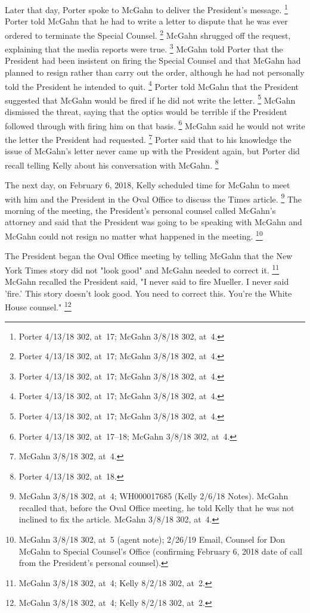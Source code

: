 {Later that day, Porter spoke to McGahn to deliver the President's message.%
\footnote{Porter 4/13/18 302, at~17;
McGahn 3/8/18 302, at~4.}
Porter told McGahn that he had to write a letter to dispute that he was ever ordered to terminate the Special Counsel.%
\footnote{Porter 4/13/18 302, at~17;
McGahn 3/8/18 302, at~4.}
McGahn shrugged off the request, explaining that the media reports were true.%
\footnote{Porter 4/13/18 302, at~17;
McGahn 3/8/18 302, at~4.}
McGahn told Porter that the President had been insistent on firing the Special Counsel and that McGahn had planned to resign rather than carry out the order, although he had not personally told the President he intended to quit.%
\footnote{Porter 4/13/18 302, at~17;
McGahn 3/8/18 302, at~4.}
Porter told McGahn that the President suggested that McGahn would be fired if he did not write the letter.%
\footnote{Porter 4/13/18 302, at~17;
McGahn 3/8/18 302, at~4.}
McGahn dismissed the threat, saying that the optics would be terrible if the President followed through with firing him on that basis.%
\footnote{Porter 4/13/18 302, at~17--18;
McGahn 3/8/18 302, at~4.}
McGahn said he would not write the letter the President had requested.%
\footnote{McGahn 3/8/18 302, at~4.}
Porter said that to his knowledge the issue of McGahn's letter never came up with the President again, but Porter did recall telling Kelly about his conversation with McGahn.%
\footnote{Porter 4/13/18 302, at~18.}

The next day, on February 6, 2018, Kelly scheduled time for McGahn to meet with him and the President in the Oval Office to discuss the Times article.%
\footnote{McGahn 3/8/18 302, at~4;
WH000017685 (Kelly 2/6/18 Notes).
McGahn recalled that, before the Oval Office meeting, he told Kelly that he was not inclined to fix the article.
McGahn 3/8/18 302, at~4.}
The morning of the meeting, the President's personal counsel called McGahn's attorney and said that the President was going to be speaking with McGahn and McGahn could not resign no matter what happened in the meeting.%
\footnote{McGahn 3/8/18 302, at~5 (agent note);
2/26/19 Email, Counsel for Don McGahn to Special Counsel's Office (confirming February 6, 2018 date of call from the President's personal counsel).}

The President began the Oval Office meeting by telling McGahn that the New York Times story did not "look good" and McGahn needed to correct it.%
\footnote{McGahn 3/8/18 302, at~4; Kelly 8/2/18 302, at~2.}
McGahn recalled the President said, "I never said to fire Mueller.
I never said 'fire.'
This story doesn't look good.
You need to correct this.
You're the White House counsel."%
\footnote{McGahn 3/8/18 302, at~4; Kelly 8/2/18 302, at~2.}

}
